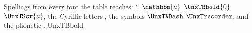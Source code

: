 Spellings from every font the table reaches: \ensuremath{\mathds{1}} \ensuremath{\mathbbm{a}} \ensuremath{\UnxTBbold{0}} \ensuremath{\UnxTScr{a}}, the Cyrillic letters {\selectfont\CYRYAT} {\selectfont\CYRHHCRS} {\selectfont\CYRSEMISFTSN} {\selectfont\CYRFITA} {\selectfont\cyrksi} {\selectfont\UnxTCyrThousands}, the symbols \ensuremath{\UnxTVDash} \ensuremath{\UnxTrecorder}, and the phonetic {\textnrleg}.
\RequirePackage{iftex}
\RequirePackage{bbm}
\RequirePackage{dsfont}
\iftutex
\RequirePackage[OT2,TU,T2B,T2C,T2D,X2]{fontenc}
\else
\RequirePackage[OT2,T1,T2B,T2C,T2D,X2]{fontenc}
\fi
\RequirePackage{tipx}
\iftutex
\renewcommand{\encodingdefault}{TU}
\else
\renewcommand{\encodingdefault}{T1}
\fi
\ifcsname UnxTBbold\endcsname\else
{}
\fi
